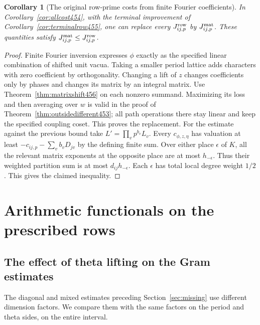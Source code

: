 \documentclass[a4paper,11pt]{article}
\newtheorem{corollary}[proposition]{Corollary}
\theoremstyle{definition}
\theoremstyle{remark}
\numberwithin{equation}{section}
\begin{document}
\begin{corollary}[The original row-prime costs from finite Fourier coefficients]\leavevmode
\label{cor:splitcost456}
In Corollary~\ref{cor:allcost454}, with the terminal improvement
of Corollary~\ref{cor:terminalrow455}, one can replace every
\(J^{\rm row}_{ij,p}\) by \(J^{\rm mat}_{ij,p}\). These
quantities satisfy \(J^{\rm mat}_{ij,p}\le J^{\rm row}_{ij,p}\).
\end{corollary}
\begin{proof}
Finite Fourier inversion expresses \(\phi\) exactly as the
specified linear combination of shifted unit vacua. Taking a
smaller period lattice adds characters with zero coefficient
by orthogonality. Changing a lift of \(z\) changes coefficients
only by phases and changes its matrix by an integral matrix.
Use Theorem~\ref{thm:matrixshift456} on each nonzero summand.
Maximizing its loss and then averaging over \(w\) is valid
in the proof of Theorem~\ref{thm:outsidedifferent453}; all
path operations there stay linear and keep the specified
coupling coset. This proves the replacement. For the estimate
against the previous bound take \(L'=\prod_v p^{b_v}L_v\).
Every \(c_{\phi,z,\eta}\) has valuation at least
\(-c_{ij,p}-\sum_v b_v D_{jv}\) by the defining finite sum.
Over either place \(\epsilon\) of \(K\), all the relevant
matrix exponents at the opposite place are at most
\(h_{-\epsilon}\). Thus their weighted partition sum is at
most \(d_{ij}h_{-\epsilon}\). Each \(\epsilon\) has total
local degree weight \(1/2\). This gives the claimed inequality.
\end{proof}

\section{Arithmetic functionals on the prescribed rows}\label{nav:g-XII-0}

\subsection{The effect of theta lifting on the Gram estimates}\label{nav:I-49}
The diagonal and mixed estimates preceding Section~\ref{sec:missing}
use different dimension factors. We compare them with the same
factors on the period and theta sides, on the entire interval.
\end{document}
